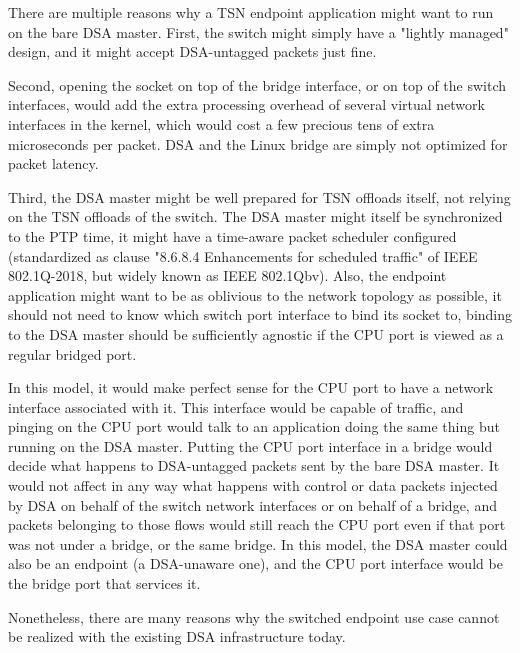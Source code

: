 \documentclass[letterpaper]{article}
\begin{document}
There are multiple reasons why a TSN endpoint application might want to run on
the bare DSA master. First, the switch might simply have a "lightly managed"
design, and it might accept DSA-untagged packets just fine.

Second, opening the socket on top of the bridge interface, or on top of the
switch interfaces, would add the extra processing overhead of several virtual
network interfaces in the kernel, which would cost a few precious tens of extra
microseconds per packet. DSA and the Linux bridge are simply not optimized for
packet latency.

Third, the DSA master might be well prepared for TSN offloads itself, not
relying on the TSN offloads of the switch. The DSA master might itself be
synchronized to the PTP time, it might have a time-aware packet scheduler
configured (standardized as clause "8.6.8.4 Enhancements for scheduled traffic"
of IEEE 802.1Q-2018, but widely known as IEEE 802.1Qbv).  Also, the endpoint
application might want to be as oblivious to the network topology as possible,
it should not need to know which switch port interface to bind its socket to,
binding to the DSA master should be sufficiently agnostic if the CPU port is
viewed as a regular bridged port.

In this model, it would make perfect sense for the CPU port to have a network
interface associated with it. This interface would be capable of traffic, and
pinging on the CPU port would talk to an application doing the same thing but
running on the DSA master. Putting the CPU port interface in a bridge would
decide what happens to DSA-untagged packets sent by the bare DSA master. It
would not affect in any way what happens with control or data packets injected
by DSA on behalf of the switch network interfaces or on behalf of a bridge, and
packets belonging to those flows would still reach the CPU port even if that
port was not under a bridge, or the same bridge. In this model, the DSA master
could also be an endpoint (a DSA-unaware one), and the CPU port interface would
be the bridge port that services it.

Nonetheless, there are many reasons why the switched endpoint use case cannot
be realized with the existing DSA infrastructure today.
\end{document}

